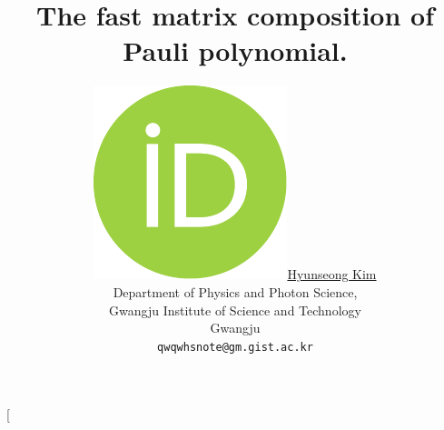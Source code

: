 \documentclass[twocolumn]{article}
\title{The fast matrix composition of Pauli polynomial.
}
\author{
    \href{https://orcid.org/0000-0002-4876-7820}{
        \includegraphics[scale=0.06]{orcid.pdf}\hspace{1mm}Hyunseong Kim}\\
  Department of Physics and Photon Science,  \\
  Gwangju Institute of Science and Technology\\
  Gwangju\\
  \texttt{qwqwhsnote@gm.gist.ac.kr} \\
}
\begin{document}
\twocolumn[ 
\begin{@twocolumnfalse}
    \begin{center}

    \maketitle

\begin{abstract}








\end{abstract}
\end{center}
\end{@twocolumnfalse}
\end{document}
